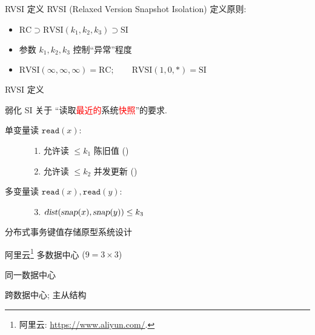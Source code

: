 \begin{frame}{RVSI 定义}
  RVSI {\small (Relaxed Version Snapshot Isolation)} 定义原则:
  \begin{itemize}
    \item<1-> $\text{RC} \supset \text{RVSI}(k_1, k_2, k_3) \supset \text{SI}$
    \item<2-> 参数 $k_1, k_2, k_3$ 控制``异常''程度
    \item<2-> $\text{RVSI}(\infty,\infty,\infty) = \text{RC}; \qquad \text{RVSI}(1,0,\ast) = \text{SI}$
  \end{itemize}

  \vspace{0.60cm}

\end{frame}
\begin{frame}{RVSI 定义}
  \begin{cdef}
	弱化 SI 关于 ``读取\textcolor{red}{最近的}系统\textcolor{red}{快照}''的要求.
	\vspace{5pt}

    \begin{description}
      \item[单变量读 $\texttt{read}(x)$:] \hfill 
        \begin{enumerate}
		  \item 允许读 $\le k_1$ 陈旧值 (\konebv{})
		  \item 允许读 $\le k_2$ 并发更新 (\ktwofv{})
        \end{enumerate}
      \item[多变量读 $\texttt{read}(x), \texttt{read}{(y)}$:] \hfill
        \begin{enumerate}
          \setcounter{enumi}{2}
		\item $\textsl{dist}(\textsl{snap}{(x)},\textsl{snap}{(y)}) \le k_3$
        \end{enumerate}
    \end{description}
  \end{cdef}
\end{frame}
\begin{frame}{\chameleon{} 分布式事务键值存储原型系统设计}
  \begin{description}
	\item[系统架构:] 阿里云\footnote{阿里云: \url{https://www.aliyun.com/}.} 
	  多数据中心 {\small ($9 = 3 \times 3$)}
	\item<2->[数据分区:] 同一数据中心
	\item<2->[数据副本:] 跨数据中心; 主从结构
  \end{description}

\end{frame}
